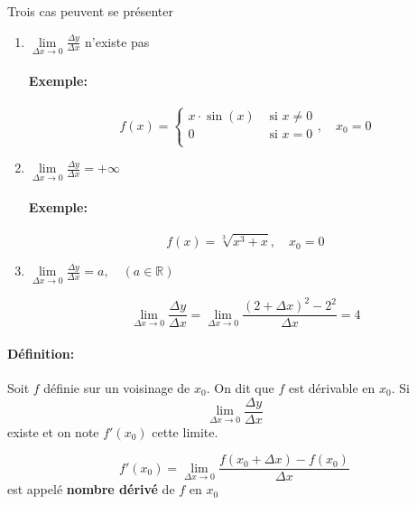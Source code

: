 \documentclass[
    11pt,
    a4paper,
    oneside,
    headinlcude, footinclude,
    twoside,
]{report}
\begin{document}
Trois cas peuvent se présenter
\begin{enumerate}
    \item $\lim\limits_{\Delta x \to 0}\frac{\Delta y}{\Delta x}$ n'existe pas 
        \paragraph{Exemple:}
        
        $$ f(x) = \left\{
            \begin{array}{ll}
            x \cdot \sin(x) & \text{ si } x \neq 0\\
            0 & \text{ si } x = 0\\
            \end{array}
        \right., \quad x_{0} = 0$$
    \item $\lim\limits_{\Delta x \to 0}\frac{\Delta y}{\Delta x} = + \infty$

        \paragraph{Exemple:}
        
        $$f(x) = \sqrt[3]{x^{3} + x}, \quad x_{0} = 0$$

    \item $\lim\limits_{\Delta x \to 0}\frac{\Delta y}{\Delta x} = a, \quad (a
        \in \mathbb{R})$

        $$\lim_{\Delta x \to 0}\frac{\Delta y}{\Delta x} = \lim_{\Delta x \to 0}\frac{
        (2 + \Delta x )^{2} - 2^{2}}{\Delta x} = 4$$
\end{enumerate}

\paragraph{Définition:}

Soit $f$ définie sur un voisinage de $x_{0}$. On dit que $f$ est dérivable en
$x_{0}$. Si 
$$\lim_{\Delta x \to 0}\frac{\Delta y}{\Delta x}$$
existe et on note $f'(x_{0})$ cette limite.

$$f'(x_{0}) = \lim_{\Delta x \to 0} \frac{f(x_{0} + \Delta x ) - f(x_{0})}{\Delta
x}$$
est appelé \textbf{nombre dérivé} de $f$ en $x_{0}$
\end{document}
